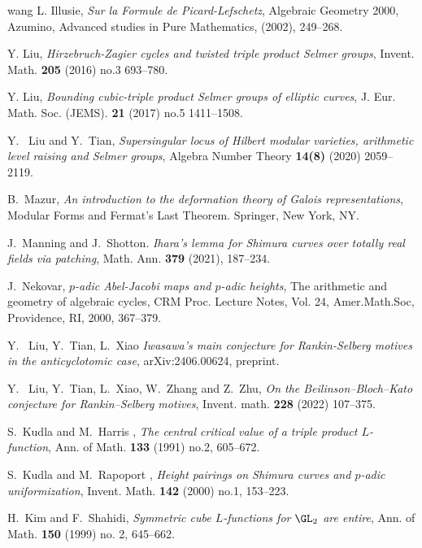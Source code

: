\begin{thebibliography}{wang}
L. Illusie, {\em Sur la Formule de Picard-Lefschetz},  Algebraic Geometry 2000, Azumino, Advanced studies in Pure Mathematics, (2002), 249--268. 


Y. Liu, {\em Hirzebruch-{Z}agier cycles and twisted triple product {S}elmer groups}, 
Invent. Math. {\bf 205} (2016) no.3  693--780.

Y. Liu, {\em Bounding cubic-triple product {S}elmer groups of elliptic curves}, 
J. Eur. Math. Soc. (JEMS). {\bf 21} (2017) no.5  1411--1508.

Y.~ Liu and Y.~Tian, {\em Supersingular locus of Hilbert modular varieties, arithmetic level raising and Selmer groups}, 
Algebra Number Theory  {\bf 14(8)} (2020) 2059--2119.

B.~Mazur,
{\em An introduction to the deformation theory of Galois representations}, Modular Forms and Fermat's Last Theorem. Springer, New York, NY. 

J.~Manning and J.~Shotton.
{\em Ihara's lemma for Shimura curves over totally real fields via patching}, Math. Ann. {\bf 379} (2021), 187--234.

J.~Nekovar, {\em $p$-adic Abel-Jacobi maps and $p$-adic heights}, The arithmetic and geometry of algebraic cycles, CRM Proc. Lecture Notes,  {V}ol. 24, Amer.Math.Soc, Providence, RI, 2000, 367--379. 

Y.~ Liu, Y.~Tian, L.~Xiao {\em Iwasawa's main conjecture for Rankin-Selberg motives in the anticyclotomic case}, 
arXiv:2406.00624, preprint.

Y.~ Liu, Y.~Tian, L.~Xiao, W.~Zhang and Z.~Zhu, {\em On the Beilinson--Bloch--Kato conjecture for Rankin--Selberg motives}, 
Invent. math. {\bf 228} (2022) 107--375.

S.~Kudla and M.~Harris , {\em The central critical value of a triple product {$L$}-function}, 
Ann. of Math. {\bf 133} (1991) no.2,  605--672.

S.~Kudla and M.~Rapoport , {\em Height pairings on {S}himura curves and {$p$}-adic uniformization}, 
Invent. Math. {\bf 142} (2000) no.1, 153--223.

H.~Kim and F.~Shahidi, {\em Symmetric cube $L$-functions for $\GL_{2}$ are entire}, 
Ann. of Math. {\bf 150} (1999) no. 2, 645--662.


\end{thebibliography}
